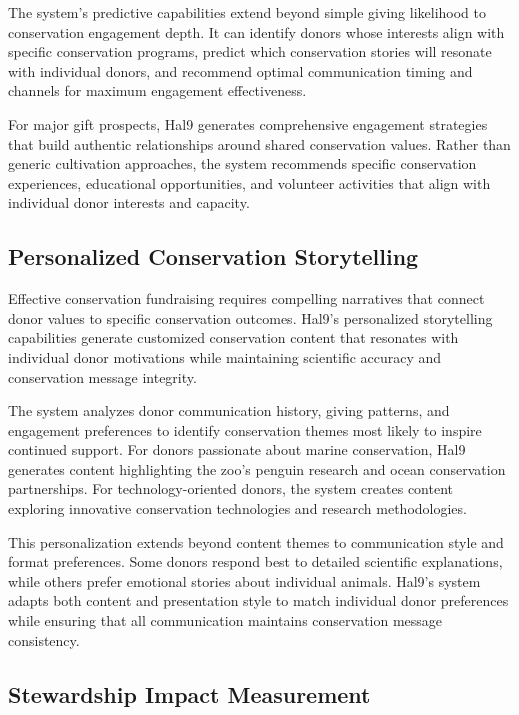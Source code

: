 \documentclass[
  Letterpaper,
]{scrbook}
\begin{document}
The system's predictive capabilities extend beyond simple giving
likelihood to conservation engagement depth. It can identify donors
whose interests align with specific conservation programs, predict which
conservation stories will resonate with individual donors, and recommend
optimal communication timing and channels for maximum engagement
effectiveness.

For major gift prospects, Hal9 generates comprehensive engagement
strategies that build authentic relationships around shared conservation
values. Rather than generic cultivation approaches, the system
recommends specific conservation experiences, educational opportunities,
and volunteer activities that align with individual donor interests and
capacity.

\subsection{Personalized Conservation
Storytelling}\label{personalized-conservation-storytelling}

Effective conservation fundraising requires compelling narratives that
connect donor values to specific conservation outcomes. Hal9's
personalized storytelling capabilities generate customized conservation
content that resonates with individual donor motivations while
maintaining scientific accuracy and conservation message integrity.

The system analyzes donor communication history, giving patterns, and
engagement preferences to identify conservation themes most likely to
inspire continued support. For donors passionate about marine
conservation, Hal9 generates content highlighting the zoo's penguin
research and ocean conservation partnerships. For technology-oriented
donors, the system creates content exploring innovative conservation
technologies and research methodologies.

This personalization extends beyond content themes to communication
style and format preferences. Some donors respond best to detailed
scientific explanations, while others prefer emotional stories about
individual animals. Hal9's system adapts both content and presentation
style to match individual donor preferences while ensuring that all
communication maintains conservation message consistency.

\subsection{Stewardship Impact
Measurement}\label{stewardship-impact-measurement}
\end{document}
